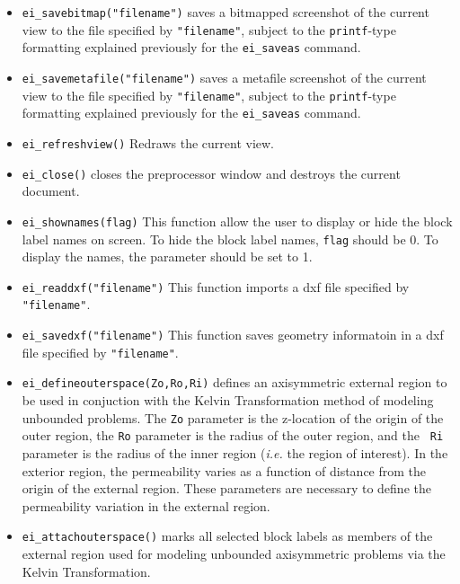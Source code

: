 \begin{itemize}
\item \texttt{ei\_savebitmap("filename")} saves a bitmapped screenshot of the current
view to the file specified by \texttt{"filename"}, subject to the
\texttt{printf}-type formatting explained previously for the
\texttt{ei\_saveas} command.

\item \texttt{ei\_savemetafile("filename")} saves a metafile screenshot of the current
view to the file specified by \texttt{"filename"}, subject to the
\texttt{printf}-type formatting explained previously for the
\texttt{ei\_saveas} command.

\item \texttt{ei\_refreshview()} Redraws the current view.

\item \texttt{ei\_close()} closes the preprocessor window and
destroys the current document.

\item \texttt{ei\_shownames(flag)} This function allow the user to display or hide the
block label names on screen. To hide the block label names,
\texttt{flag} should be 0. To display the names, the parameter
should be set to 1.

\item{\tt ei\_readdxf("filename")} This function imports a dxf file specified by {\tt "filename"}.

\item{\tt ei\_savedxf("filename")} This function saves geometry informatoin in a dxf file specified by {\tt "filename"}.

\item{\tt ei\_defineouterspace(Zo,Ro,Ri)} defines
an axisymmetric external region to be used in conjuction with the
Kelvin Transformation method of modeling unbounded problems.  The
{\tt Zo} parameter is the z-location of the origin of the outer region,
the {\tt Ro} parameter is the radius of the outer region, and the {\tt
Ri} parameter is the radius of the inner region ({\em i.e.} the region of
interest). In the exterior region, the permeability varies as a function of
distance from the origin of the external region.  These parameters
are necessary to define the permeability variation in the external
region.

\item{\tt ei\_attachouterspace()} marks all
selected block labels as members of the external region used for
modeling unbounded axisymmetric problems via the Kelvin
Transformation.


\end{itemize}
